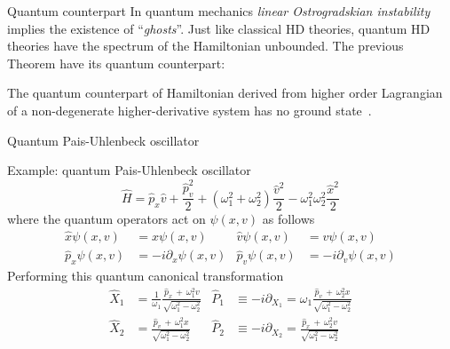 \begin{frame}{Quantum counterpart}
  In quantum mechanics \emph{linear Ostrogradskian instability} implies the
  existence of ``\emph{ghosts}''. Just like classical HD theories, quantum HD
  theories have the spectrum of the Hamiltonian unbounded. The previous Theorem
  have its quantum counterpart:
  \vspace{2.0em}
  \begin{theorem} \vspace{0.5em}
    The quantum counterpart of Hamiltonian derived from higher order
    Lagrangian of a non-degenerate higher-derivative system has no ground
    state~\cite{Smilga17}.
  \end{theorem}
\end{frame}

\begin{frame}{Quantum Pais-Uhlenbeck oscillator}
  \begin{block}{Example: quantum Pais-Uhlenbeck oscillator}
    \vspace{0.2em}
    \begin{equation*}
      \hat{H} = \hat{p}_x \hat{v} + \frac{\hat{p}_v^2}{2}
      + \left(\omega_1^2 + \omega_2^2\right)\frac{\hat{v}^2}{2}
      - \omega_1^2\omega_2^2 \frac{\hat{x}^2}{2}
    \end{equation*}
    where the quantum operators act on $\psi(x, v)$ as follows
    \begin{align*}
      \hat{x}\psi(x, v) &= x \psi(x, v) &
      \hat{v}\psi(x, v) &= v \psi(x, v) \\
      \hat{p}_x\psi(x, v) &= -i\partial_x \psi(x, v) &
      \hat{p}_v\psi(x, v) &= -i\partial_v \psi(x, v)
    \end{align*}
    Performing this quantum canonical transformation~\cite{Mannheim05}
    \begin{align*}
      \hat{X}_1 &= \frac{1}{\omega_1}
        \frac{\hat{p}_x \, + \,  \omega_1^2 v} {\sqrt{\omega_1^2-\omega_2^2}} &
      \hat{P}_1 & \equiv -i \partial_{X_1} = \omega_1
        \frac{\hat{p}_v \, + \,  \omega_2^2 x} {\sqrt{\omega_1^2-\omega_2^2}} \\
      \hat{X}_2 &=
        \frac{\hat{p}_v \, + \,  \omega_1^2 x} {\sqrt{\omega_1^2-\omega_2^2}} &
      \hat{P}_2 & \equiv -i \partial_{X_2} =
        \frac{\hat{p}_x \, + \,  \omega_2^2 v} {\sqrt{\omega_1^2-\omega_2^2}}
    \end{align*}
  \end{block}
\end{frame}

